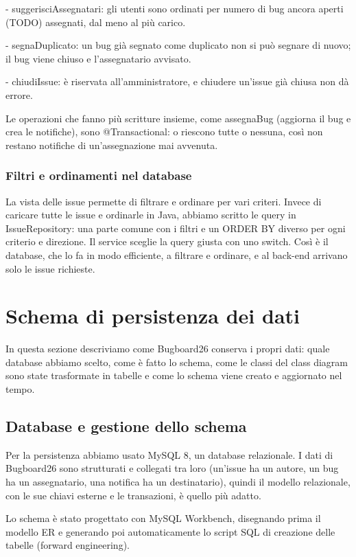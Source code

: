 - suggerisciAssegnatari: gli utenti sono ordinati per numero di 
bug ancora aperti (TODO) assegnati, dal meno al più carico. 

- segnaDuplicato: un bug già segnato come duplicato non si può 
segnare di nuovo; il bug viene chiuso e l'assegnatario avvisato. 

- chiudiIssue: è riservata all'amministratore, e chiudere 
un'issue già chiusa non dà errore. 

Le operazioni che fanno più scritture insieme, come assegnaBug 
(aggiorna il bug e crea le notifiche), sono @Transactional: o riescono 
tutte o nessuna, così non restano notifiche di un'assegnazione mai avvenuta. 

\subsubsection{Filtri e ordinamenti nel database}
La vista delle issue permette di filtrare e ordinare per vari criteri. 
Invece di caricare tutte le issue e ordinarle in Java, abbiamo scritto 
le query in IssueRepository: una parte comune con i filtri e un ORDER BY 
diverso per ogni criterio e direzione. Il service sceglie la query giusta 
con uno switch. Così è il database, che lo fa in modo efficiente, a filtrare e 
ordinare, e al back-end arrivano solo le issue richieste. 

\section{Schema di persistenza dei dati}
In questa sezione descriviamo come Bugboard26 conserva i propri dati: 
quale database abbiamo scelto, come è fatto lo schema, come le classi del 
class diagram sono state trasformate in tabelle e come lo schema viene creato 
e aggiornato nel tempo. 

\subsection{Database e gestione dello schema}
Per la persistenza abbiamo usato MySQL 8, un database relazionale. I 
dati di Bugboard26 sono strutturati e collegati tra loro (un'issue ha un 
autore, un bug ha un assegnatario, una notifica ha un destinatario), quindi 
il modello relazionale, con le sue chiavi esterne e le transazioni, è quello più adatto. 

Lo schema è stato progettato con MySQL Workbench, disegnando prima il 
modello ER e generando poi automaticamente lo script SQL di creazione delle 
tabelle (forward engineering). 

